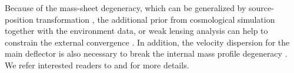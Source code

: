 \documentclass[useAMS,usenatbib]{mnras}
\def\dt{D_{\Delta t}}
\begin{document}
Because of the mass-sheet degeneracy, which can be generalized by source-position transformation \citep{FalcoEtal85,SchneiderSluse13,SchneiderSluse14,XuEtal16}, 
the additional prior from cosmological simulation together with the environment data, or weak lensing analysis can help to constrain the external convergence \citep[$\kappa_{\textrm{ext}}$, ][]{SuyuEtal10,FassnachtEtal11,RusuEtal17,TihhonovaEtal17}. In addition, the velocity dispersion for the main deflector is also necessary to break the internal mass profile degeneracy \citep{Suyu12,XuEtal16}. We refer interested readers to \citet{TreuMarshall16} and \citet{SuyuEtal18} for more details.
\end{document}
